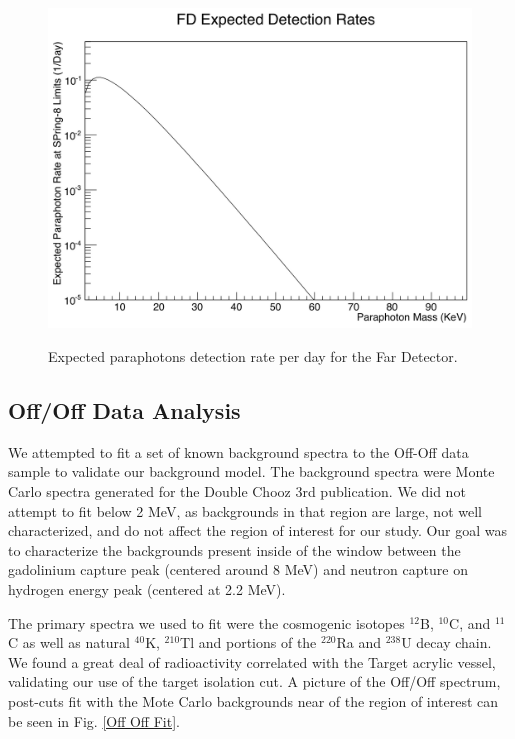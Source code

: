 \begin{figure}
\caption{Expected paraphotons detection rate per day for the Far Detector.}
\includegraphics[width=\textwidth]{Paraphotons/FD_Expected_Detection_Rates.jpg}
\label{Para_Rates}
\end{figure}


\subsection{Off/Off Data Analysis}
  We attempted to fit a set of known background spectra to the Off-Off data sample to validate our background model. The background spectra were Monte Carlo spectra generated for the Double Chooz 3rd publication. We did not attempt to fit below 2 MeV, as backgrounds in that region are large, not well characterized, and do not affect the region of interest for our study. Our goal was to characterize the backgrounds present inside of the window between the gadolinium capture peak (centered around 8 MeV) and neutron capture on hydrogen energy peak (centered at 2.2 MeV).
  
  The primary spectra we used to fit were the cosmogenic isotopes $^{12}$B, $^{10}$C, and $^{11}$C as well as natural $^{40}$K, $^{210}$Tl and portions of the $^{220}$Ra and $^{238}$U decay chain. We found a great deal of radioactivity correlated with the Target acrylic vessel, validating our use of the target isolation cut. A picture of the Off/Off spectrum, post-cuts fit with the Mote Carlo backgrounds near of the region of interest can be seen in Fig. \ref{Off Off Fit}.
  
